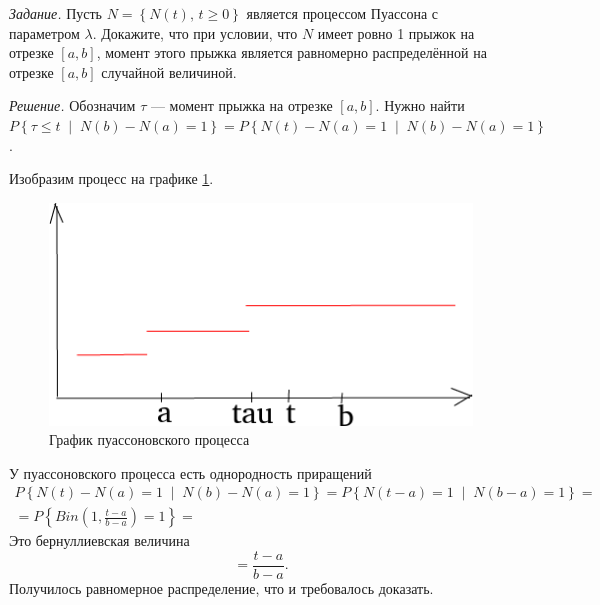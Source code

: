 \textit{Задание.}
Пусть $N = \left\{ N \left( t \right), \, t \geq 0 \right\} $
является процессом Пуассона с параметром $ \lambda $.
Докажите, что при условии, что $N$ имеет ровно 1 прыжок на отрезке $ \left[ a, b \right] $,
момент этого прыжка является равномерно распределённой на отрезке $ \left[ a, b \right] $
случайной величиной.

\textit{Решение.}
Обозначим $ \tau $ --- момент прыжка на отрезке $ \left[ a, b \right] $.
Нужно найти
$P \left\{ \tau \leq t \; \middle| \; N \left( b \right) - N \left( a \right) = 1 \right\} =
  P \left\{
    N \left( t \right) - N \left( a \right) = 1 \; \middle| \;
    N \left( b \right) - N \left( a \right) = 1 \right\} $.

Изобразим процесс на графике \ref{fig:35}.

\begin{figure}[h!]
  \centering
  \includegraphics[width=.4\textwidth]{./pictures/3_5.png}
  \caption{График пуассоновского процесса}
  \label{fig:35}
\end{figure}

У пуассоновского процесса есть однородность приращений
\begin{gather*}
  P \left\{
    N \left( t \right) - N \left( a \right) = 1 \; \middle| \;
    N \left( b \right) - N \left( a \right) = 1 \right\} =
  P \left\{ N \left( t - a \right) = 1 \; \middle| \; N \left( b - a \right) = 1 \right\} = \\
  = P \left\{ Bin \left( 1, \frac{t - a}{b - a} \right) = 1 \right\} =
\end{gather*}
Это бернуллиевская величина
$$= \frac{t - a}{b - a}.$$
Получилось равномерное распределение, что и требовалось доказать.

